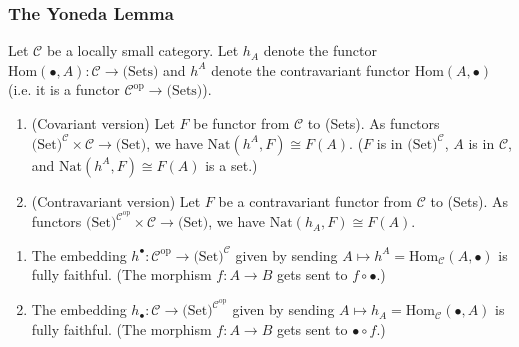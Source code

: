 \subsubsection{The Yoneda Lemma}
\begin{lem}
Let $ \mathcal C$ be a locally small category.  Let $ h_A$ denote the functor $ \text{Hom}(\bullet, A): \mathcal C\to \text{(Sets)}$ and $ h^A$ denote the contravariant functor $ \text{Hom}(A,\bullet)$ (i.e. it is a functor $ \mathcal C^{\text{op}}\to \text{(Sets)}$).
\begin{enumerate}
\item 
(Covariant version) Let $ F$ be functor from $ \mathcal C$ to (Sets). As functors $ \text{(Set)}^{\mathcal C}\times \mathcal C \to \text{(Set)}$, we have $ \text{Nat}(h^A,F)\cong F(A)$.  ($ F$ is in $ \text{(Set)}^{\mathcal C}$, $ A$ is in $ \mathcal C$, and $ \text{Nat}(h^A,F)\cong F(A)$ is a set.)
\item 
(Contravariant version) Let $ F$ be a contravariant functor from $ \mathcal C$ to (Sets). As functors $ \text{(Set)}^{\mathcal C^{\text{op}}}\times \mathcal C \to \text{(Set)}$, we have $ \text{Nat}(h_A,F)\cong F(A)$.
\end{enumerate}
\end{lem}
\begin{cor}
\begin{enumerate}
\item
The embedding $ h^{\bullet}:\mathcal C^{\text{op}}\to \text{(Set)}^{\mathcal C}$ given by sending $ A\mapsto h^A=\text{Hom}_{\mathcal C}(A,\bullet)$ is fully faithful. (The morphism $ f:A\to B$ gets sent to $f\circ \bullet$.)
\item
The embedding $ h_{\bullet}:\mathcal C\to \text{(Set)}^{\mathcal C^{\text{op}}}$ given by sending $ A\mapsto h_A=\text{Hom}_{\mathcal C}(\bullet,A)$ is fully faithful. (The morphism $ f:A\to B$ gets sent to $\bullet\circ f$.)
\end{enumerate}
\end{cor}
